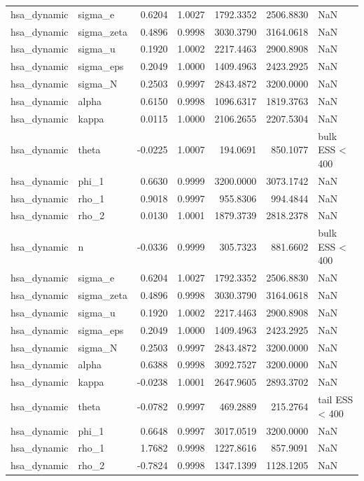\begin{tabular}{llrrrrl}
hsa\_dynamic & sigma\_e & 0.6204 & 1.0027 & 1792.3352 & 2506.8830 & NaN \\
hsa\_dynamic & sigma\_zeta & 0.4896 & 0.9998 & 3030.3790 & 3164.0618 & NaN \\
hsa\_dynamic & sigma\_u & 0.1920 & 1.0002 & 2217.4463 & 2900.8908 & NaN \\
hsa\_dynamic & sigma\_eps & 0.2049 & 1.0000 & 1409.4963 & 2423.2925 & NaN \\
hsa\_dynamic & sigma\_N & 0.2503 & 0.9997 & 2843.4872 & 3200.0000 & NaN \\
hsa\_dynamic & alpha & 0.6150 & 0.9998 & 1096.6317 & 1819.3763 & NaN \\
hsa\_dynamic & kappa & 0.0115 & 1.0000 & 2106.2655 & 2207.5304 & NaN \\
hsa\_dynamic & theta & -0.0225 & 1.0007 & 194.0691 & 850.1077 & bulk ESS < 400 \\
hsa\_dynamic & phi\_1 & 0.6630 & 0.9999 & 3200.0000 & 3073.1742 & NaN \\
hsa\_dynamic & rho\_1 & 0.9018 & 0.9997 & 955.8306 & 994.4844 & NaN \\
hsa\_dynamic & rho\_2 & 0.0130 & 1.0001 & 1879.3739 & 2818.2378 & NaN \\
hsa\_dynamic & n & -0.0336 & 0.9999 & 305.7323 & 881.6602 & bulk ESS < 400 \\
hsa\_dynamic & sigma\_e & 0.6204 & 1.0027 & 1792.3352 & 2506.8830 & NaN \\
hsa\_dynamic & sigma\_zeta & 0.4896 & 0.9998 & 3030.3790 & 3164.0618 & NaN \\
hsa\_dynamic & sigma\_u & 0.1920 & 1.0002 & 2217.4463 & 2900.8908 & NaN \\
hsa\_dynamic & sigma\_eps & 0.2049 & 1.0000 & 1409.4963 & 2423.2925 & NaN \\
hsa\_dynamic & sigma\_N & 0.2503 & 0.9997 & 2843.4872 & 3200.0000 & NaN \\
hsa\_dynamic & alpha & 0.6388 & 0.9998 & 3092.7527 & 3200.0000 & NaN \\
hsa\_dynamic & kappa & -0.0238 & 1.0001 & 2647.9605 & 2893.3702 & NaN \\
hsa\_dynamic & theta & -0.0782 & 0.9997 & 469.2889 & 215.2764 & tail ESS < 400 \\
hsa\_dynamic & phi\_1 & 0.6648 & 0.9997 & 3017.0519 & 3200.0000 & NaN \\
hsa\_dynamic & rho\_1 & 1.7682 & 0.9998 & 1227.8616 & 857.9091 & NaN \\
hsa\_dynamic & rho\_2 & -0.7824 & 0.9998 & 1347.1399 & 1128.1205 & NaN \\

\end{tabular}
